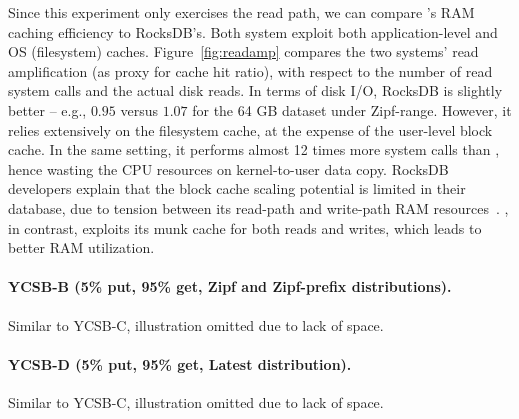 Since this experiment only exercises the read path, we can compare \sys's RAM caching 
efficiency to RocksDB's. Both system exploit both application-level and OS (filesystem) caches. 
Figure~\ref{fig:readamp} compares the two systems' read amplification (as proxy for cache hit ratio), 
with respect to the number of read system calls and the actual disk reads.  In terms of disk I/O, RocksDB 
is slightly better -- e.g., $0.95$ versus $1.07$ for the 64 GB dataset under Zipf-range. However, it 
relies extensively on the filesystem cache, at the expense of the user-level block cache. In the same
setting, it performs almost 12 times more system calls than \sys, hence wasting the CPU resources on  
kernel-to-user data copy. RocksDB developers explain that the block cache scaling potential is limited in their
database, due to tension between its read-path and write-path RAM resources~\cite{RocksDB-default-blockcache-issue}. 
\sys, in contrast, exploits its munk cache for both reads and writes, which leads to better RAM utilization. 

\paragraph{YCSB-B (5\% put, 95\% get, Zipf and Zipf-prefix distributions).} Similar to YCSB-C, illustration omitted due to 
lack of space. 

\paragraph{YCSB-D (5\% put, 95\% get, Latest distribution).} Similar to YCSB-C, illustration omitted due to lack of space. 


